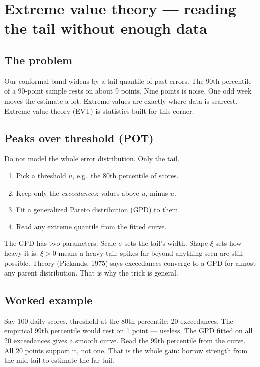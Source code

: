 \section{Extreme value theory --- reading the tail without enough data}

\subsection{The problem}

Our conformal band widens by a tail quantile of past errors.
The 90th percentile of a 90-point sample rests on about 9 points.
Nine points is noise. One odd week moves the estimate a lot.
Extreme values are exactly where data is scarcest.
Extreme value theory (EVT) is statistics built for this corner.

\subsection{Peaks over threshold (POT)}

Do not model the whole error distribution. Only the tail.

\begin{enumerate}
  \item Pick a threshold $u$, e.g.\ the 80th percentile of scores.
  \item Keep only the \emph{exceedances}: values above $u$, minus $u$.
  \item Fit a generalized Pareto distribution (GPD) to them.
  \item Read any extreme quantile from the fitted curve.
\end{enumerate}

The GPD has two parameters. Scale $\sigma$ sets the tail's width.
Shape $\xi$ sets how heavy it is. $\xi > 0$ means a heavy tail:
spikes far beyond anything seen are still possible. Theory
(Pickands, 1975) says exceedances converge to a GPD for almost any
parent distribution. That is why the trick is general.

\subsection{Worked example}

Say 100 daily scores, threshold at the 80th percentile: 20 exceedances.
The empirical 99th percentile would rest on 1 point --- useless.
The GPD fitted on all 20 exceedances gives a smooth curve.
Read the 99th percentile from the curve. All 20 points support it,
not one. That is the whole gain: borrow strength from the mid-tail
to estimate the far tail.


